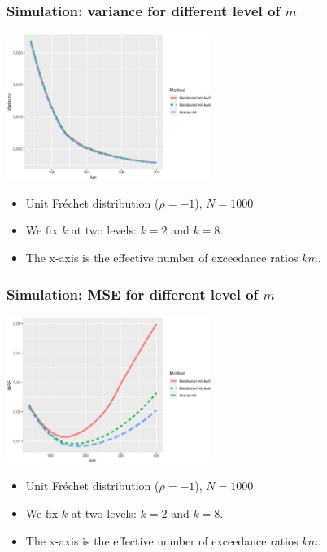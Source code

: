 \documentclass{beamer}
\begin{document}
\begin{frame}
    \frametitle{Simulation: variance for different level of $m$}
    \begin{center}
        \includegraphics[width = 0.5\textwidth]{Simulation/Frechet_oracle_variance.eps}  
    \end{center}
    \begin{itemize}
        \item Unit Fr\'echet distribution ($\rho=-1$), $N=1000$
        \item We fix $k$ at two levels: $k=2$ and $k=8$.
        \item The x-axis is the effective number of exceedance ratios $km$.
    \end{itemize}

\end{frame}

\begin{frame}
    \frametitle{Simulation: MSE for different level of $m$}
    \begin{center}
         \includegraphics[width = 0.5\textwidth]{Simulation/Frechet_oracle_mse.eps} 
    \end{center}
    \begin{itemize}
        \item Unit Fr\'echet distribution ($\rho=-1$), $N=1000$
        \item We fix $k$ at two levels: $k=2$ and $k=8$.
        \item The x-axis is the effective number of exceedance ratios $km$.
    \end{itemize}

\end{frame}
\end{document}
